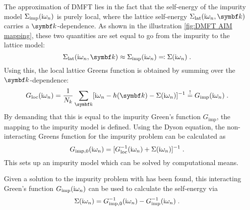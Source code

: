 \documentclass[../main.tex]{subfiles}
\begin{document}
The approximation of DMFT lies in the fact that the self-energy of the impurity model \(\Sigma_{\mathrm{imp}} (\mathrm{i} \omega_n)\) is purely local, where the lattice self-energy \(\Sigma_{\mathrm{lat}} (\iu \omega_n, \vb{k})\) carries a \(\vb{k}\)-dependence.
As shown in the illustration \cref{fig:DMFT AIM mapping}, these two quantities are set equal to go from the impurity to the lattice model:
\begin{equation}
	\Sigma_{\mathrm{lat}} (\iu \omega_n, \vb{k}) \approx \Sigma_{\mathrm{imp}} (\iu \omega_n) \eqcolon \Sigma (\iu \omega_n) \;.
\end{equation}
Using this, the local lattice Greens function is obtained by summing over the \(\vb{k}\)-dependence:
\begin{equation}
	G_{\mathrm{loc}} (\iu \omega_n) = \frac{1}{N_k} \sum_{\vb{k}} [\iu \omega_n - h(\vb{k}) - \Sigma (\iu \omega_n)]^{-1} \overset{!}{=} G_{\mathrm{imp}} (\iu \omega_n) \;.
	\label{eq:local_lattice_Greens_function}
\end{equation}
By demanding that this is equal to the impurity Green's function \(G_{\mathrm{imp}}\), the mapping to the impurity model is defined.
Using the Dyson equation, the non-interacting Greens function for the impurity problem can be calculated as
\begin{equation}
	G_{\mathrm{imp}, 0} (\mathrm{i} \omega_n) = [G_{\mathrm{loc}}^{-1} (\mathrm{i} \omega_n) + \Sigma (\mathrm{i} \omega_n)]^{-1} \;.
	\label{eq:non-interacting_impurity_Greens_function}
\end{equation}
This sets up an impurity model which can be solved by computational means.

Given a solution to the impurity problem with has been found, this interacting Green's function \(G_{\mathrm{imp}} (\mathrm{i} \omega_n)\) can be used to calculate the self-energy via
\begin{equation}
	\Sigma (\mathrm{i} \omega_n) = G_{\mathrm{imp},0}^{-1} (\mathrm{i} \omega_n) - G_{\mathrm{imp}}^{-1} (\mathrm{i} \omega_n) \;.
	\label{eq:DMFT_loop_get_self-energy}
\end{equation}
\end{document}
